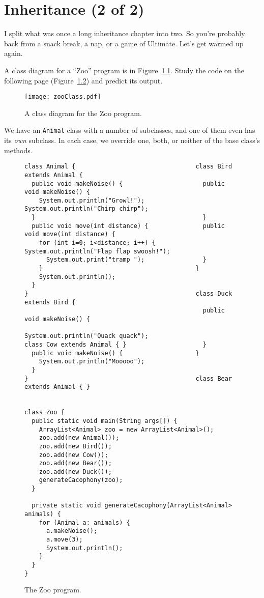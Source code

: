 
\chapter{Inheritance (2 of 2)}
\label{ch:inheritance2}

I split what was once a long inheritance chapter into two. So you're probably
back from a snack break, a nap, or a game of Ultimate. Let's get warmed up
again.

A class diagram for a ``Zoo'' program is in Figure~\ref{fig:zooClass}. Study
the code on the following page (Figure~\ref{fig:zooCode}) and predict its
output.

\begin{figure}[ht]
\label{zooExample}
\centering
\texttt{[image: zooClass.pdf]}
\caption{A class diagram for the Zoo program.}
\label{fig:zooClass}
\end{figure}

We have an \texttt{Animal} class with a number of subclasses, and one of them
even has its \textit{own} subclass. In each case, we override one, both, or
neither of the base class's methods.

\begin{figure}
\begin{Verbatim}[fontsize=\scriptsize,samepage=true,frame=single]
class Animal {                                 class Bird extends Animal {
  public void makeNoise() {                      public void makeNoise() {
    System.out.println("Growl!");                  System.out.println("Chirp chirp");
  }                                              }
  public void move(int distance) {               public void move(int distance) {
    for (int i=0; i<distance; i++) {               System.out.println("Flap flap swoosh!");
      System.out.print("tramp ");                }
    }                                          }
    System.out.println();                      
  }
}                                              class Duck extends Bird {
                                                 public void makeNoise() {
                                                   System.out.println("Quack quack");
class Cow extends Animal { }                     }
  public void makeNoise() {                    }
    System.out.println("Mooooo");              
  }
}                                              class Bear extends Animal { }


class Zoo {
  public static void main(String args[]) {
    ArrayList<Animal> zoo = new ArrayList<Animal>();
    zoo.add(new Animal());
    zoo.add(new Bird());
    zoo.add(new Cow());
    zoo.add(new Bear());
    zoo.add(new Duck());
    generateCacophony(zoo);
  }

  private static void generateCacophony(ArrayList<Animal> animals) {
    for (Animal a: animals) {
      a.makeNoise();
      a.move(3);
      System.out.println();
    }
  }
}\end{Verbatim}
\caption{The Zoo program.}
\label{fig:zooCode}
\end{figure}

